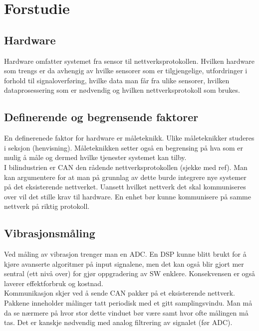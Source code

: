 \chapter{Forstudie}

\section{Hardware}

Hardware omfatter systemet fra sensor til nettverksprotokollen. Hvilken hardware
som trengs er da avhengig av hvilke sensorer som er tilgjengelige, utfordringer
i forhold til signaloverføring, hvilke data
man får fra ulike sensorer, hvilken dataprosessering som er nødvendig og
hvilken nettverksprotokoll som brukes.

\section{Definerende og begrensende faktorer}

En definerenede faktor for hardware er måleteknikk. Ulike måleteknikker studeres
i seksjon (henvisning). Måleteknikken setter også en begrensing på hva som er
mulig å måle og dermed hvilke tjenester systemet kan tilby. \\

I bilindustrien er CAN den rådende nettverksprotokollen (sjekke med ref). Man
kan argumentere for at man på grunnlag av dette burde integrere nye systemer på
det eksisterende nettverket. Uansett hvilket nettverk det skal kommuniseres over
vil det stille krav til hardware. En enhet bør kunne kommunisere på samme
nettverk på riktig protokoll. \\

\section{Vibrasjonsmåling}

Ved måling av vibrasjon trenger man en ADC. En DSP kunne blitt brukt for å kjøre
avanserte algoritmer på input signalene, men det kan også blir gjort mer sentral
(ett nivå over) for gjør oppgradering av SW enklere. Konsekvensen er også
laverer effektforbruk og kostnad. \\

Kommunikasjon skjer ved å sende CAN pakker på et eksisterende nettverk. Pakkene
inneholder målinger tatt periodisk med et gitt samplingsvindu. Man må da se
nærmere på hvor stor dette vinduet bør være samt hvor ofte målingen må tas. Det
er kanskje nødvendig med analog filtrering av signalet (før ADC). \\

